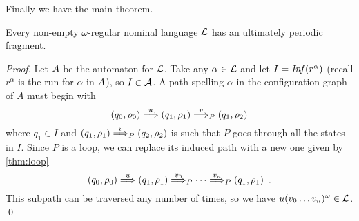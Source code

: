 Finally we have the main theorem.
%
\begin{theorem}
Every non-empty $\omega$-regular nominal language $\mathcal{L}$ has an ultimately periodic fragment.
\end{theorem}
\begin{proof}
Let $A$ be the automaton for $\mathcal{L}$. Take any $\alpha \in \mathcal{L}$ and let $I = \mathit{Inf}(r^\alpha)$ (recall $r^\alpha$ is the run for $\alpha$ in $A$), so $I \in \mathcal{A}$. A path spelling $\alpha$ in the configuration graph of $A$ must  begin with
\[
	(q_0,\rho_0) \overset{u}{\Longrightarrow} (q_1,\rho_1) \overset{v}{\Longrightarrow}_{P} (q_1,\rho_2)
\]
where $q_1 \in I$ and $(q_1,\rho_1) \overset{v}{\Longrightarrow}_{P} (q_2,\rho_2)$ is such that $P$ goes through all the states in $I$. Since $P$ is a loop, we can replace its induced path with a new one given by \cref{thm:loop} 
\[
	(q_0,\rho_0) \overset{u}{\Longrightarrow} (q_1,\rho_1) \overset{v_0}{\Longrightarrow}_{P} \cdots \overset{v_n}{\Longrightarrow}_{P} (q_1,\rho_1) \enspace .
\]
This subpath can be traversed any number of times, so we have $u(v_0\dots v_n)^\omega \in \mathcal{L}$.
\qed
\end{proof}
